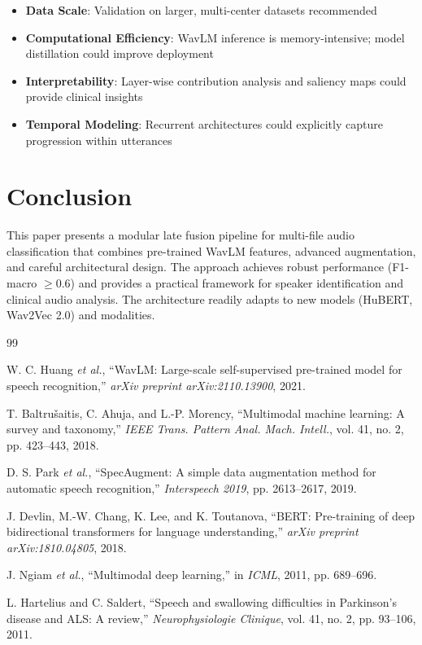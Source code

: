 \documentclass[conference]{IEEEtran}
\begin{document}
\begin{itemize}
  \item \textbf{Data Scale}: Validation on larger, multi-center datasets recommended
  \item \textbf{Computational Efficiency}: WavLM inference is memory-intensive; model distillation could improve deployment
  \item \textbf{Interpretability}: Layer-wise contribution analysis and saliency maps could provide clinical insights
  \item \textbf{Temporal Modeling}: Recurrent architectures could explicitly capture progression within utterances
\end{itemize}

\section{Conclusion}

This paper presents a modular late fusion pipeline for multi-file audio classification that combines pre-trained WavLM features, advanced augmentation, and careful architectural design. The approach achieves robust performance (F1-macro $\geq 0.6$) and provides a practical framework for speaker identification and clinical audio analysis. The architecture readily adapts to new models (HuBERT, Wav2Vec 2.0) and modalities.

\begin{thebibliography}{99}

 W. C. Huang \textit{et al.}, ``WavLM: Large-scale self-supervised pre-trained model for speech recognition,'' \textit{arXiv preprint arXiv:2110.13900}, 2021.

 T. Baltrušaitis, C. Ahuja, and L.-P. Morency, ``Multimodal machine learning: A survey and taxonomy,'' \textit{IEEE Trans. Pattern Anal. Mach. Intell.}, vol. 41, no. 2, pp. 423--443, 2018.

 D. S. Park \textit{et al.}, ``SpecAugment: A simple data augmentation method for automatic speech recognition,'' \textit{Interspeech 2019}, pp. 2613--2617, 2019.

 J. Devlin, M.-W. Chang, K. Lee, and K. Toutanova, ``BERT: Pre-training of deep bidirectional transformers for language understanding,'' \textit{arXiv preprint arXiv:1810.04805}, 2018.

 J. Ngiam \textit{et al.}, ``Multimodal deep learning,'' in \textit{ICML}, 2011, pp. 689--696.

 L. Hartelius and C. Saldert, ``Speech and swallowing difficulties in Parkinson's disease and ALS: A review,'' \textit{Neurophysiologie Clinique}, vol. 41, no. 2, pp. 93--106, 2011.

\end{thebibliography}
\end{document}
